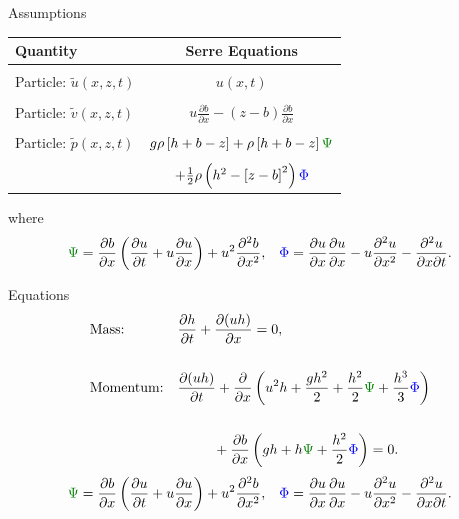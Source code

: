 \documentclass[pdf]{beamer}
\begin{document}
\begin{frame}{Assumptions}
	\bigbreak
	\pause
	\begin{tabular}{l | c }
		Quantity& Serre Equations\\
		\hline \\
		Particle: $\tilde{u}(x,z,t)$ & $u(x,t)$ \\ &  \\ 
		\pause
		Particle: $\tilde{v}(x,z,t)$ & $u\frac{\partial b}{\partial x} - (z - b)\frac{\partial b}{\partial x}$ \\ &  \\ 
		\pause
		Particle: $\tilde{p}(x,z,t)$& $g \rho \left[h + b - z\right] + \rho \left[h + b - z\right] { \color{green!50!black}\Psi } $ \\& \\ & $+ \frac{1}{2} \rho \left(h^2 - \left[z - b \right]^2\right) { \color{blue} \Phi }$  \\ \hline
	\end{tabular}
	\bigbreak
	where
	\begin{align*}
	&{ \color{green!50!black}\Psi }  = \dfrac{\partial b}{\partial x}\left(\dfrac{\partial u}{\partial t} + u\dfrac{\partial u}{\partial x} \right)  + u^2\dfrac{\partial^2 b}{\partial x^2}, &
	{ \color{blue} \Phi }  = \dfrac{\partial u }{\partial x} \dfrac{\partial u}{\partial x} -u \dfrac{\partial^2 u}{\partial x^2}  - \dfrac{\partial^2 u}{\partial x \partial t} .
	\end{align*}
\end{frame}

\begin{frame}{Equations}
	\begin{subequations}
		\begin{align*}
		&\text{Mass:} && \frac{\partial h}{\partial t} + \dfrac{\partial (uh)}{\partial x} = 0,  \\ \\
		&\text{Momentum:} &&\dfrac{\partial (uh)}{\partial t} + \dfrac{\partial}{\partial x} \left ( u^2h + \dfrac{gh^2}{2} + \dfrac{h^2}{2}{ \color{green!50!black}\Psi } + \dfrac{h^3}{3}{ { \color{blue} \Phi } }  \right )   \\ \\& &&\quad \quad \; \; +  \dfrac{\partial b}{\partial x} \left (gh +   h { \color{green!50!black}\Psi } + \dfrac{h^2}{2}{ { \color{blue} \Phi } }  \right ) = 0.
		\end{align*}
	\end{subequations}
	\begin{align*}
	&{ \color{green!50!black}\Psi }  = \dfrac{\partial b}{\partial x}\left(\dfrac{\partial u}{\partial t} + u\dfrac{\partial u}{\partial x} \right)  + u^2\dfrac{\partial^2 b}{\partial x^2}, &
	{ \color{blue} \Phi }  = \dfrac{\partial u }{\partial x} \dfrac{\partial u}{\partial x} -u \dfrac{\partial^2 u}{\partial x^2}  - \dfrac{\partial^2 u}{\partial x \partial t} .
	\end{align*}
\end{frame}
\end{document}

